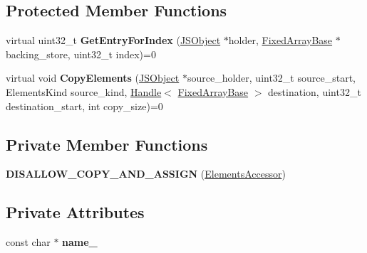 \subsection*{Protected Member Functions}
\begin{DoxyCompactItemize}
\item 
virtual uint32\+\_\+t {\bfseries Get\+Entry\+For\+Index} (\hyperlink{classv8_1_1internal_1_1_j_s_object}{J\+S\+Object} $\ast$holder, \hyperlink{classv8_1_1internal_1_1_fixed_array_base}{Fixed\+Array\+Base} $\ast$backing\+\_\+store, uint32\+\_\+t index)=0\hypertarget{classv8_1_1internal_1_1_elements_accessor_ab025eed13a5720526cabb7950a2a22b7}{}\label{classv8_1_1internal_1_1_elements_accessor_ab025eed13a5720526cabb7950a2a22b7}

\item 
virtual void {\bfseries Copy\+Elements} (\hyperlink{classv8_1_1internal_1_1_j_s_object}{J\+S\+Object} $\ast$source\+\_\+holder, uint32\+\_\+t source\+\_\+start, Elements\+Kind source\+\_\+kind, \hyperlink{classv8_1_1internal_1_1_handle}{Handle}$<$ \hyperlink{classv8_1_1internal_1_1_fixed_array_base}{Fixed\+Array\+Base} $>$ destination, uint32\+\_\+t destination\+\_\+start, int copy\+\_\+size)=0\hypertarget{classv8_1_1internal_1_1_elements_accessor_abb137b592fd9ed5338425d843b41188f}{}\label{classv8_1_1internal_1_1_elements_accessor_abb137b592fd9ed5338425d843b41188f}

\end{DoxyCompactItemize}
\subsection*{Private Member Functions}
\begin{DoxyCompactItemize}
\item 
{\bfseries D\+I\+S\+A\+L\+L\+O\+W\+\_\+\+C\+O\+P\+Y\+\_\+\+A\+N\+D\+\_\+\+A\+S\+S\+I\+GN} (\hyperlink{classv8_1_1internal_1_1_elements_accessor}{Elements\+Accessor})\hypertarget{classv8_1_1internal_1_1_elements_accessor_a5ad0d5159ed7c182518336710fb22d68}{}\label{classv8_1_1internal_1_1_elements_accessor_a5ad0d5159ed7c182518336710fb22d68}

\end{DoxyCompactItemize}
\subsection*{Private Attributes}
\begin{DoxyCompactItemize}
\item 
const char $\ast$ {\bfseries name\+\_\+}\hypertarget{classv8_1_1internal_1_1_elements_accessor_a3eb2af6cbfa8c1d8cbc16a0fc22d3662}{}\label{classv8_1_1internal_1_1_elements_accessor_a3eb2af6cbfa8c1d8cbc16a0fc22d3662}

\end{DoxyCompactItemize}
